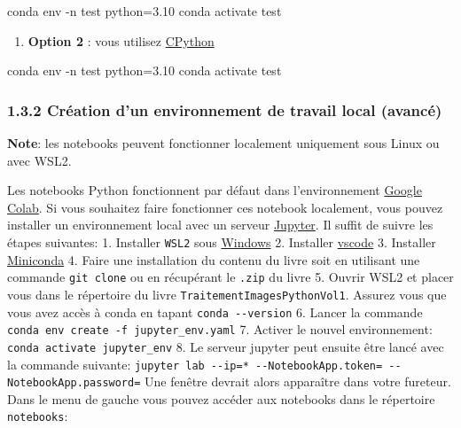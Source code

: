 \documentclass[
]{article}
\newenvironment{Shaded}{}{}
\newcommand{\AttributeTok}[1]{\textcolor[rgb]{0.49,0.56,0.16}{#1}}
\newcommand{\ExtensionTok}[1]{#1}
\newcommand{\NormalTok}[1]{#1}
\providecommand{\tightlist}{%
  \setlength{\itemsep}{0pt}\setlength{\parskip}{0pt}}
\begin{document}
\label{cb1}
\begin{Shaded}
\begin{Highlighting}[]
\ExtensionTok{conda}\NormalTok{ env }\AttributeTok{{-}n}\NormalTok{ test python=3.10}
\ExtensionTok{conda}\NormalTok{ activate test}
\end{Highlighting}
\end{Shaded}

\begin{enumerate}
\def\labelenumi{\arabic{enumi}.}
\setcounter{enumi}{1}
\tightlist
\item
  \textbf{Option 2} : vous utilisez
  \href{https://www.python.org/downloads/}{CPython}
\end{enumerate}

\label{cb2}
\begin{Shaded}
\begin{Highlighting}[]
\ExtensionTok{conda}\NormalTok{ env }\AttributeTok{{-}n}\NormalTok{ test python=3.10}
\ExtensionTok{conda}\NormalTok{ activate test}
\end{Highlighting}
\end{Shaded}

\subsubsection{\texorpdfstring{{1.3.2} Création d'un environnement de
travail local
(avancé)}{1.3.2 Création d'un environnement de travail local (avancé)}}\label{cruxe9ation-dun-environnement-de-travail-local-avancuxe9}

\textbf{Note}: les notebooks peuvent fonctionner localement uniquement
sous Linux ou avec WSL2.

Les notebooks Python fonctionnent par défaut dans l'environnement
\href{https://colab.google/}{Google Colab}. Si vous souhaitez faire
fonctionner ces notebook localement, vous pouvez installer un
environnement local avec un serveur
\href{https://jupyterlab.readthedocs.io/en/stable/getting_started/starting.html}{Jupyter}.
Il suffit de suivre les étapes suivantes: 1. Installer \texttt{WSL2}
sous
\href{https://learn.microsoft.com/en-us/windows/wsl/install}{Windows} 2.
Installer
\href{https://code.visualstudio.com/docs/setup/windows}{vscode} 3.
Installer
\href{https://docs.anaconda.com/miniconda/install/\#quick-command-line-install}{Miniconda}
4. Faire une installation du contenu du livre soit en utilisant une
commande \texttt{git\ clone} ou en récupérant le \texttt{.zip} du livre
5. Ouvrir WSL2 et placer vous dans le répertoire du livre
\texttt{TraitementImagesPythonVol1}. Assurez vous que vous avez accès à
conda en tapant \texttt{conda\ -\/-version} 6. Lancer la commande
\texttt{conda\ env\ create\ -f\ jupyter\_env.yaml} 7. Activer le nouvel
environnement: \texttt{conda\ activate\ jupyter\_env} 8. Le serveur
jupyter peut ensuite être lancé avec la commande suivante:
\texttt{jupyter\ lab\ -\/-ip=\textquotesingle{}*\textquotesingle{}\ -\/-NotebookApp.token=\textquotesingle{}\textquotesingle{}\ -\/-NotebookApp.password=\textquotesingle{}\textquotesingle{}}
Une fenêtre devrait alors apparaître dans votre fureteur. Dans le menu
de gauche vous pouvez accéder aux notebooks dans le répertoire
\texttt{notebooks}:
\end{document}
